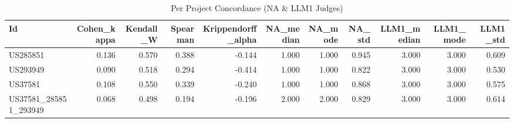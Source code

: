 \begin{table}
\caption{Per Project Concordance (NA & LLM1 Judges)}
\label{tab:per_project_concordance_NA_LLM1_judges}
\begin{tabular}{lrrrrrrrrrr}
\toprule
Id & Cohen_kappa & Kendall_W & Spearman & Krippendorff_alpha & NA_median & NA_mode & NA_std & LLM1_median & LLM1_mode & LLM1_std \\
\midrule
US285851 & 0.136 & 0.570 & 0.388 & -0.144 & 1.000 & 1.000 & 0.945 & 3.000 & 3.000 & 0.609 \\
US293949 & 0.090 & 0.518 & 0.294 & -0.414 & 1.000 & 1.000 & 0.822 & 3.000 & 3.000 & 0.530 \\
US37581 & 0.108 & 0.550 & 0.339 & -0.240 & 1.000 & 1.000 & 0.868 & 3.000 & 3.000 & 0.575 \\
US37581_285851_293949 & 0.068 & 0.498 & 0.194 & -0.196 & 2.000 & 2.000 & 0.829 & 3.000 & 3.000 & 0.614 \\
\bottomrule
\end{tabular}
\end{table}
